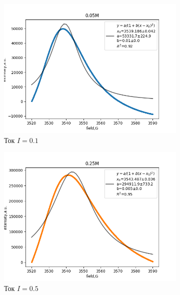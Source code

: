 \documentclass{article}
\begin{document}
\begin{figure}[h!]
  \centering
  \begin{subfigure}[b]{0.3\linewidth}
    \includegraphics[width=\linewidth]{2.1/21.png}
    \caption{Ток $I = 0.1$}
  \end{subfigure}
  \begin{subfigure}[b]{0.3\linewidth}
    \includegraphics[width=\linewidth]{2.1/22.png}
    \caption{Ток $I = 0.5$}
  \end{subfigure}
  \begin{subfigure}[b]{0.3\linewidth}

\end{subfigure}
\end{figure}
\end{document}
